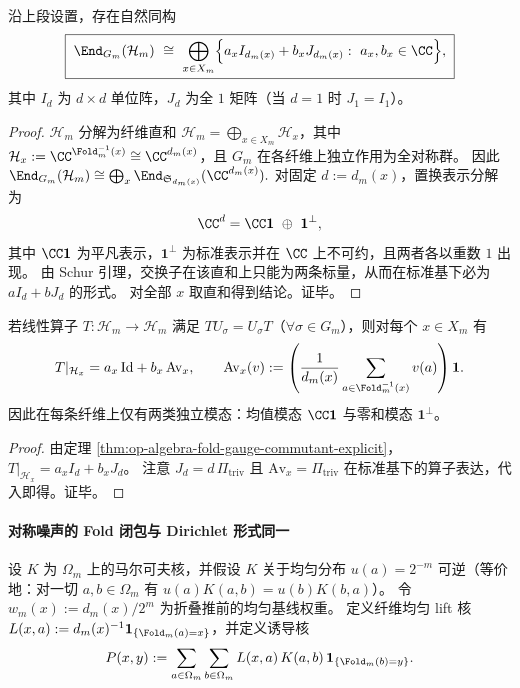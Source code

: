 \begin{theorem}\label{thm:op-algebra-fold-gauge-commutant-explicit}
沿上段设置，存在自然同构
\[
\boxed{\;
\End_{G_m}(\mathcal H_m)\ \cong\ \bigoplus_{x\in X_m}\Bigl\{a_x I_{d_m(x)}+b_x J_{d_m(x)}:\ a_x,b_x\in\CC\Bigr\},\;}
\]
其中 \(I_d\) 为 \(d\times d\) 单位阵，\(J_d\) 为全 \(1\) 矩阵（当 \(d=1\) 时 \(J_1=I_1\)）。
\end{theorem}
\begin{proof}
\(\mathcal H_m\) 分解为纤维直和 \(\mathcal H_m=\bigoplus_{x\in X_m}\mathcal H_x\)，其中 \(\mathcal H_x:=\CC^{\Fold_m^{-1}(x)}\cong \CC^{d_m(x)}\)，且 \(G_m\) 在各纤维上独立作用为全对称群。
因此
\(
\End_{G_m}(\mathcal H_m)\cong\bigoplus_x \End_{\mathfrak S_{d_m(x)}}(\CC^{d_m(x)}).
\)
对固定 \(d:=d_m(x)\)，置换表示分解为
\[
\CC^d=\CC\mathbf 1\ \oplus\ \mathbf 1^\perp,
\]
其中 \(\CC\mathbf 1\) 为平凡表示，\(\mathbf 1^\perp\) 为标准表示并在 \(\CC\) 上不可约，且两者各以重数 \(1\) 出现。
由 Schur 引理，交换子在该直和上只能为两条标量，从而在标准基下必为 \(aI_d+bJ_d\) 的形式。
对全部 \(x\) 取直和得到结论。证毕。
\end{proof}

\begin{corollary}[纤维等变算子的两模态结构]\label{cor:op-algebra-fold-gauge-two-mode}
若线性算子 \(T:\mathcal H_m\to\mathcal H_m\) 满足 \(TU_\sigma=U_\sigma T\)（\(\forall\sigma\in G_m\)），则对每个 \(x\in X_m\) 有
\[
T|_{\mathcal H_x}=a_x\,\mathrm{Id}+b_x\,\mathrm{Av}_x,
\qquad
\mathrm{Av}_x(v):=\left(\frac{1}{d_m(x)}\sum_{a\in\Fold_m^{-1}(x)}v(a)\right)\mathbf 1.
\]
因此在每条纤维上仅有两类独立模态：均值模态 \(\CC\mathbf 1\) 与零和模态 \(\mathbf 1^\perp\)。
\end{corollary}
\begin{proof}
由定理 \ref{thm:op-algebra-fold-gauge-commutant-explicit}，\(T|_{\mathcal H_x}=a_x I_d+b_x J_d\)。
注意 \(J_d=d\,\Pi_{\mathrm{triv}}\) 且 \(\mathrm{Av}_x=\Pi_{\mathrm{triv}}\) 在标准基下的算子表达，代入即得。证毕。
\end{proof}

\paragraph{对称噪声的 Fold 闭包与 Dirichlet 形式同一}
设 \(K\) 为 \(\Omega_m\) 上的马尔可夫核，并假设 \(K\) 关于均匀分布 \(u(a)=2^{-m}\) 可逆（等价地：对一切 \(a,b\in\Omega_m\) 有 \(u(a)K(a,b)=u(b)K(b,a)\)）。
令 \(w_m(x):=d_m(x)/2^m\) 为折叠推前的均匀基线权重。
定义纤维均匀 lift 核 \(L(x,a):=d_m(x)^{-1}\mathbf 1_{\{\Fold_m(a)=x\}}\)，并定义诱导核
\[
P(x,y):=\sum_{a\in\Omega_m}\sum_{b\in\Omega_m} L(x,a)\,K(a,b)\,\mathbf 1_{\{\Fold_m(b)=y\}}.
\]

